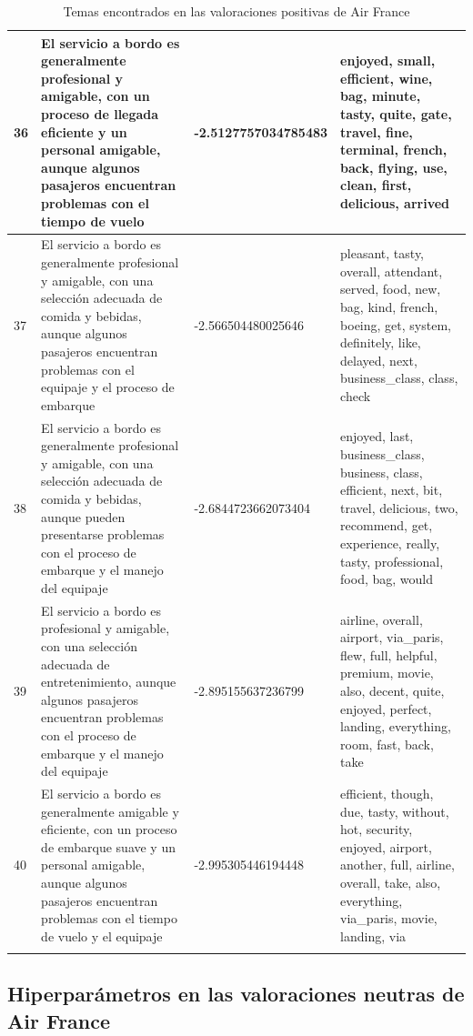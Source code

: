 \documentclass{report}
\begin{document}
{{\begin{longtable}{|p{1cm}|p{4cm}|p{4cm}|p{6cm}|}
                    \hline
                    36 & El servicio a bordo es generalmente profesional y amigable, con un proceso de llegada eficiente y un personal amigable, aunque algunos pasajeros encuentran problemas con el tiempo de vuelo & -2.5127757034785483 & enjoyed, small, efficient, wine, bag, minute, tasty, quite, gate, travel, fine, terminal, french, back, flying, use, clean, first, delicious, arrived \\
                    \hline
                    37 & El servicio a bordo es generalmente profesional y amigable, con una selección adecuada de comida y bebidas, aunque algunos pasajeros encuentran problemas con el equipaje y el proceso de embarque & -2.566504480025646 & pleasant, tasty, overall, attendant, served, food, new, bag, kind, french, boeing, get, system, definitely, like, delayed, next, business\_class, class, check \\
                    \hline
                    38 & El servicio a bordo es generalmente profesional y amigable, con una selección adecuada de comida y bebidas, aunque pueden presentarse problemas con el proceso de embarque y el manejo del equipaje & -2.6844723662073404 & enjoyed, last, business\_class, business, class, efficient, next, bit, travel, delicious, two, recommend, get, experience, really, tasty, professional, food, bag, would \\
                    \hline
                    39 & El servicio a bordo es profesional y amigable, con una selección adecuada de entretenimiento, aunque algunos pasajeros encuentran problemas con el proceso de embarque y el manejo del equipaje & -2.895155637236799 & airline, overall, airport, via\_paris, flew, full, helpful, premium, movie, also, decent, quite, enjoyed, perfect, landing, everything, room, fast, back, take \\
                    \hline
                    40 & El servicio a bordo es generalmente amigable y eficiente, con un proceso de embarque suave y un personal amigable, aunque algunos pasajeros encuentran problemas con el tiempo de vuelo y el equipaje & -2.995305446194448 & efficient, though, due, tasty, without, hot, security, enjoyed, airport, another, full, airline, overall, take, also, everything, via\_paris, movie, landing, via \\
                    \hline
                    \caption{Temas encontrados en las valoraciones positivas de Air France}
                \end{longtable}
            \clearpage\subsection{Hiperparámetros en las valoraciones neutras de Air France}
}}
\end{document}
